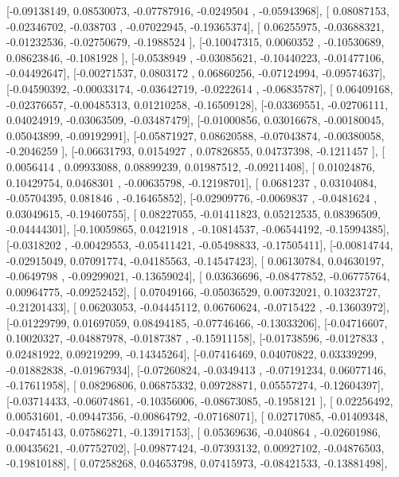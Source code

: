 \documentclass{article}
\begin{document}
       [-0.09138149,  0.08530073, -0.07787916, -0.0249504 , -0.05943968],
       [ 0.08087153, -0.02346702, -0.038703  , -0.07022945, -0.19365374],
       [ 0.06255975, -0.03688321, -0.01232536, -0.02750679, -0.1988524 ],
       [-0.10047315,  0.0060352 , -0.10530689,  0.08623846, -0.1081928 ],
       [-0.0538949 , -0.03085621, -0.10440223, -0.01477106, -0.04492647],
       [-0.00271537,  0.0803172 ,  0.06860256, -0.07124994, -0.09574637],
       [-0.04590392, -0.00033174, -0.03642719, -0.0222614 , -0.06835787],
       [ 0.06409168, -0.02376657, -0.00485313,  0.01210258, -0.16509128],
       [-0.03369551, -0.02706111,  0.04024919, -0.03063509, -0.03487479],
       [-0.01000856,  0.03016678, -0.00180045,  0.05043899, -0.09192991],
       [-0.05871927,  0.08620588, -0.07043874, -0.00380058, -0.2046259 ],
       [-0.06631793,  0.0154927 ,  0.07826855,  0.04737398, -0.1211457 ],
       [ 0.0056414 ,  0.09933088,  0.08899239,  0.01987512, -0.09211408],
       [ 0.01024876,  0.10429754,  0.0468301 , -0.00635798, -0.12198701],
       [ 0.0681237 ,  0.03104084, -0.05704395,  0.081846  , -0.16465852],
       [-0.02909776, -0.0069837 , -0.0481624 ,  0.03049615, -0.19460755],
       [ 0.08227055, -0.01411823,  0.05212535,  0.08396509, -0.04444301],
       [-0.10059865,  0.0421918 , -0.10814537, -0.06544192, -0.15994385],
       [-0.0318202 , -0.00429553, -0.05411421, -0.05498833, -0.17505411],
       [-0.00814744, -0.02915049,  0.07091774, -0.04185563, -0.14547423],
       [ 0.06130784,  0.04630197, -0.0649798 , -0.09299021, -0.13659024],
       [ 0.03636696, -0.08477852, -0.06775764,  0.00964775, -0.09252452],
       [ 0.07049166, -0.05036529,  0.00732021,  0.10323727, -0.21201433],
       [ 0.06203053, -0.04445112,  0.06760624, -0.0715422 , -0.13603972],
       [-0.01229799,  0.01697059,  0.08494185, -0.07746466, -0.13033206],
       [-0.04716607,  0.10020327, -0.04887978, -0.0187387 , -0.15911158],
       [-0.01738596, -0.0127833 ,  0.02481922,  0.09219299, -0.14345264],
       [-0.07416469,  0.04070822,  0.03339299, -0.01882838, -0.01967934],
       [-0.07260824, -0.0349413 , -0.07191234,  0.06077146, -0.17611958],
       [ 0.08296806,  0.06875332,  0.09728871,  0.05557274, -0.12604397],
       [-0.03714433, -0.06074861, -0.10356006, -0.08673085, -0.1958121 ],
       [ 0.02256492,  0.00531601, -0.09447356, -0.00864792, -0.07168071],
       [ 0.02717085, -0.01409348, -0.04745143,  0.07586271, -0.13917153],
       [ 0.05369636, -0.040864  , -0.02601986,  0.00435621, -0.07752702],
       [-0.09877424, -0.07393132,  0.00927102, -0.04876503, -0.19810188],
       [ 0.07258268,  0.04653798,  0.07415973, -0.08421533, -0.13881498],
\end{document}
